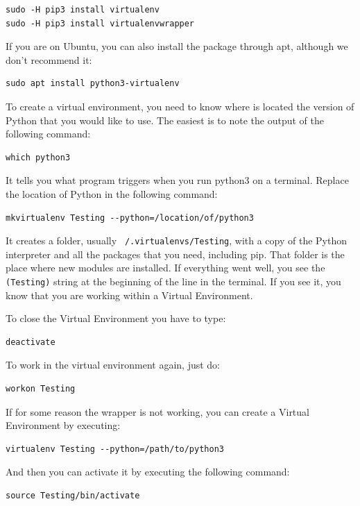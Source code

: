 \begin{verbatim}
sudo -H pip3 install virtualenv
sudo -H pip3 install virtualenvwrapper
\end{verbatim}

If you are on Ubuntu, you can also install the package through apt, although we don't recommend it:
\begin{verbatim}
sudo apt install python3-virtualenv
\end{verbatim}

To create a virtual environment, you need to know where is located the version of Python that you would like to use. The easiest is to note the output of the following command:

\begin{verbatim}
which python3
\end{verbatim}

It tells you what program triggers when you run python3 on a terminal. Replace the location of Python in the following command:
\begin{verbatim}
mkvirtualenv Testing --python=/location/of/python3
\end{verbatim}

It creates a folder, usually \texttt{~/.virtualenvs/Testing}, with a copy of the Python interpreter and all the packages that you need, including pip. That folder is the place where new modules are installed. If everything went well, you see the \texttt{(Testing)} string at the beginning of the line in the terminal. If you see it, you know that you are working within a Virtual Environment.

To close the Virtual Environment you have to type:

\begin{verbatim}
deactivate
\end{verbatim}

To work in the virtual environment again, just do:
\begin{verbatim}
workon Testing
\end{verbatim}

If for some reason the wrapper is not working, you can create a Virtual Environment by executing:
\begin{verbatim}
virtualenv Testing --python=/path/to/python3
\end{verbatim}
And then you can activate it by executing the following command:
\begin{verbatim}
source Testing/bin/activate
\end{verbatim}

